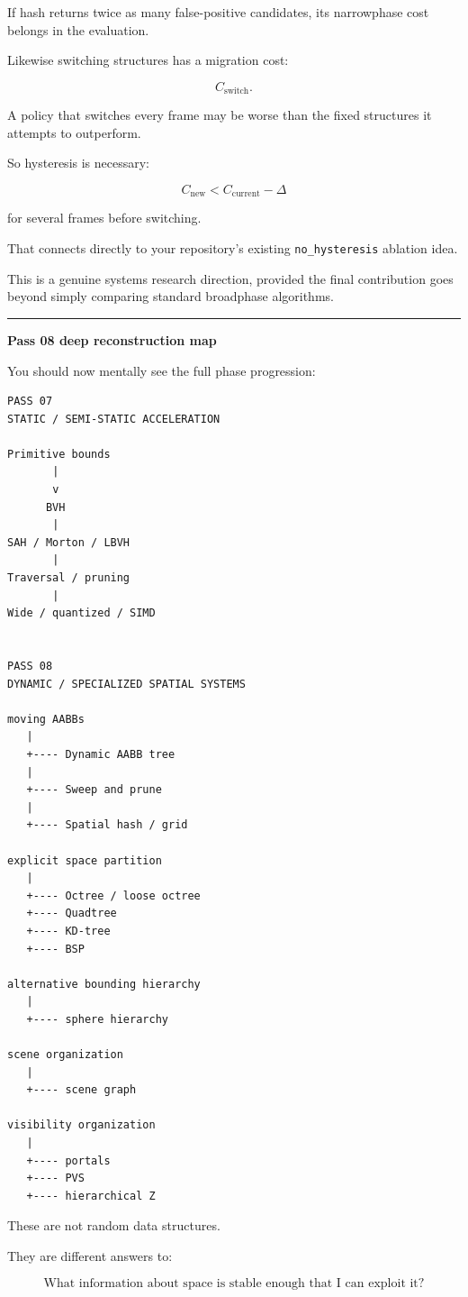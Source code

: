 If hash returns twice as many false-positive candidates, its narrowphase cost belongs in the evaluation.

Likewise switching structures has a migration cost:

\[
C_{\text{switch}}.
\]

A policy that switches every frame may be worse than the fixed structures it attempts to outperform.

So hysteresis is necessary:

\[
C_{\text{new}}
<
C_{\text{current}}-\Delta
\]

for several frames before switching.

That connects directly to your repository's existing \texttt{no\_hysteresis} ablation idea.

This is a genuine systems research direction, provided the final contribution goes beyond simply comparing standard broadphase algorithms.

\begin{center}\rule{0.5\linewidth}{0.5pt}\end{center}

\textbf{Pass 08 deep reconstruction map}

You should now mentally see the full phase progression:

\begin{verbatim}
PASS 07
STATIC / SEMI-STATIC ACCELERATION

Primitive bounds
       |
       v
      BVH
       |
SAH / Morton / LBVH
       |
Traversal / pruning
       |
Wide / quantized / SIMD


PASS 08
DYNAMIC / SPECIALIZED SPATIAL SYSTEMS

moving AABBs
   |
   +---- Dynamic AABB tree
   |
   +---- Sweep and prune
   |
   +---- Spatial hash / grid

explicit space partition
   |
   +---- Octree / loose octree
   +---- Quadtree
   +---- KD-tree
   +---- BSP

alternative bounding hierarchy
   |
   +---- sphere hierarchy

scene organization
   |
   +---- scene graph

visibility organization
   |
   +---- portals
   +---- PVS
   +---- hierarchical Z
\end{verbatim}

These are not random data structures.

They are different answers to:

\[
\boxed{
\text{What information about space is stable enough that I can exploit it?}
}
\]

